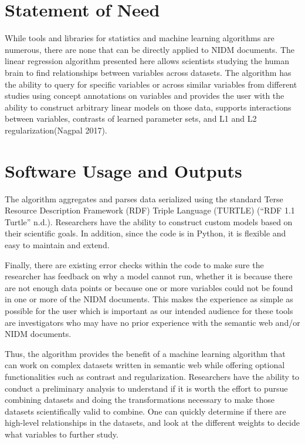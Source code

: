\section{Statement of Need}

While tools and libraries for statistics and machine learning algorithms
are numerous, there are none that can be directly applied to NIDM
documents. The linear regression algorithm presented here allows
scientists studying the human brain to find relationships between
variables across datasets. The algorithm has the ability to query for
specific variables or across similar variables from different studies
using concept annotations on variables and provides the user with the
ability to construct arbitrary linear models on those data, supports
interactions between variables, contrasts of learned parameter sets, and
L1 and L2 regularization(Nagpal 2017).

\section{Software Usage and Outputs}

The algorithm aggregates and parses data serialized using the standard
Terse Resource Description Framework (RDF) Triple Language (TURTLE)
(``RDF 1.1 Turtle'' n.d.). Researchers have the ability to construct
custom models based on their scientific goals. In addition, since the
code is in Python, it is flexible and easy to maintain and extend.

Finally, there are existing error checks within the code to make sure
the researcher has feedback on why a model cannot run, whether it is
because there are not enough data points or because one or more
variables could not be found in one or more of the NIDM documents. This
makes the experience as simple as possible for the user which is
important as our intended audience for these tools are investigators who
may have no prior experience with the semantic web and/or NIDM
documents.

Thus, the algorithm provides the benefit of a machine learning algorithm
that can work on complex datasets written in semantic web while offering
optional functionalities such as contrast and regularization.
Researchers have the ability to conduct a preliminary analysis to
understand if it is worth the effort to pursue combining datasets and
doing the transformations necessary to make those datasets
scientifically valid to combine. One can quickly determine if there are
high-level relationships in the datasets, and look at the different
weights to decide what variables to further study.

